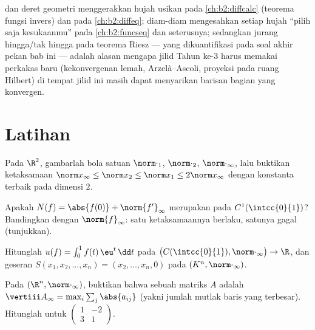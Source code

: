 \begin{remark}
 dan deret geometri menggerakkan hujah usikan
pada \cref{ch:b2:diffcalc} (teorema fungsi invers) dan
 pada \cref{ch:b2:diffeq};  diam-diam mengesahkan setiap hujah ``pilih saja 
kesukaanmu'' pada \cref{ch:b2:funcseq} dan seterusnya; sedangkan
jurang hingga/tak hingga pada teorema Riesz --- yang dikuantifikasi pada
soal akhir pekan bab ini --- adalah alasan mengapa jilid Tahun
ke-3 harus memakai perkakas baru (kekonvergenan lemah, Arzelà--Ascoli,
proyeksi pada ruang Hilbert) di tempat jilid ini masih dapat menyarikan
barisan bagian yang konvergen.
\end{remark}

\section{Latihan}

\begin{exercise}[$\star$]\label{exo:b2:nvs:1}
Pada $\R^2$, gambarlah bola satuan $\norm\cdot_1$, $\norm\cdot_2$,
$\norm\cdot_\infty$, lalu buktikan ketaksamaan $\norm x_\infty
\leq \norm x_2 \leq \norm x_1 \leq 2\norm x_\infty$ dengan konstanta
terbaik pada dimensi $2$.
\end{exercise}

\begin{exercise}[$\star$]\label{exo:b2:nvs:2}
Apakah $N(f) = \abs{f(0)} + \norm{f'}_\infty$ merupakan  pada
$C^1(\intcc{0}{1})$? Bandingkan dengan $\norm{f}_\infty$: satu
ketaksamaannya berlaku, satunya gagal (tunjukkan).
\end{exercise}

\begin{exercise}[$\star$]\label{exo:b2:nvs:3}
Hitunglah  $u(f) = \int_0^1 f(t)\,\eu^t\,\dd t$
pada $\bigl(C(\intcc{0}{1}), \norm\cdot_\infty\bigr) \to \R$, dan  geseran $S(x_1, x_2, \dots, x_n) = (x_2, \dots, x_n, 0)$ pada
$(K^n, \norm\cdot_\infty)$.
\end{exercise}

\begin{exercise}[$\star\star$]\label{exo:b2:nvs:4}
Pada $(\R^n, \norm\cdot_\infty)$, buktikan bahwa  sebuah
matriks $A$ adalah $\vertiii A_\infty = \max_i \sum_j \abs{a_{ij}}$
(yakni jumlah mutlak baris yang terbesar). Hitunglah untuk $\begin{pmatrix} 1 & -2\\
3 & 1\end{pmatrix}$.
\end{exercise}

